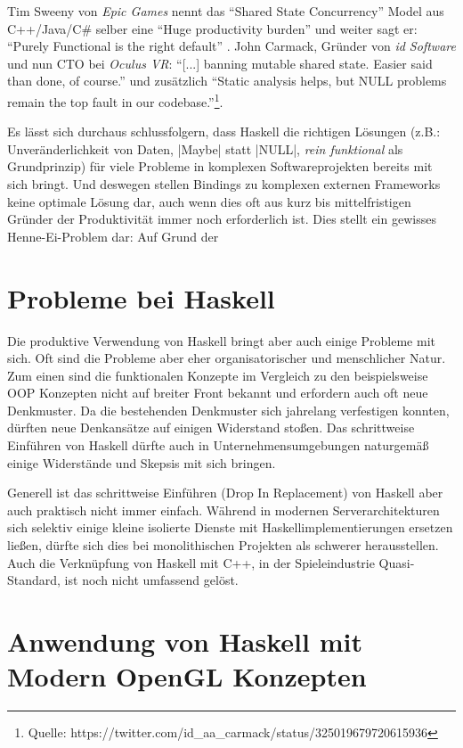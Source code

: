 
Tim Sweeny von \textit{Epic Games} nennt das "`Shared State Concurrency"' Model aus C++/Java/C\# selber eine "`Huge productivity burden"' und weiter sagt er: "`Purely Functional is the right default"' \parencite[Vgl.][Seite 42 u. Seite 56]{Sweeney2006}. John Carmack, Gründer von \textit{id Software} und nun CTO bei \textit{Oculus VR}: "`[...] banning mutable shared state. Easier said than done, of course."' und zusätzlich "`Static analysis helps, but NULL problems remain the top fault in our codebase."'\footnote{Quelle: https://twitter.com/id\_aa\_carmack/status/325019679720615936}.

Es lässt sich durchaus schlussfolgern, dass Haskell die richtigen Lösungen (z.B.: Unveränderlichkeit von Daten, |Maybe| statt |NULL|, \textit{rein funktional} als Grundprinzip) für viele Probleme in komplexen Softwareprojekten bereits mit sich bringt. Und deswegen stellen Bindings zu komplexen externen Frameworks keine optimale Lösung dar, auch wenn dies oft aus kurz bis mittelfristigen Gründer der Produktivität immer noch erforderlich ist. Dies stellt ein gewisses Henne-Ei-Problem dar: Auf Grund der 

\section{Probleme bei Haskell}

Die produktive Verwendung von Haskell bringt aber auch einige Probleme mit sich. Oft sind die Probleme aber eher organisatorischer und menschlicher Natur. Zum einen sind die funktionalen Konzepte im Vergleich zu den beispielsweise OOP Konzepten nicht auf breiter Front bekannt und erfordern auch oft neue Denkmuster. Da die bestehenden Denkmuster sich jahrelang verfestigen konnten, dürften neue Denkansätze auf einigen Widerstand stoßen. Das schrittweise Einführen von Haskell dürfte auch in Unternehmensumgebungen naturgemäß einige Widerstände und Skepsis mit sich bringen.

Generell ist das schrittweise Einführen (Drop In Replacement) von Haskell aber auch praktisch nicht immer einfach. Während in modernen Serverarchitekturen sich selektiv einige kleine isolierte Dienste mit Haskellimplementierungen ersetzen ließen, dürfte sich dies bei monolithischen Projekten als schwerer herausstellen. Auch die Verknüpfung von Haskell mit C++, in der Spieleindustrie Quasi-Standard, ist noch nicht umfassend gelöst.


\begingroup
\setlength\intextsep{0pt}
\section{Anwendung von Haskell mit Modern OpenGL Konzepten}

